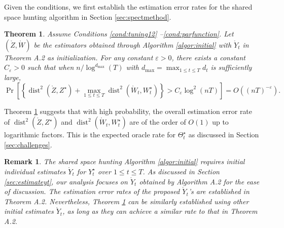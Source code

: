 \documentclass[12pt]{article}
\newcommand{\blue}[1]{\textcolor{blue}{#1}}
\newtheorem{theorem}{Theorem}
\newtheorem{remark}{Remark}
\newcommand{\dmax}{d_{\operatorname{max}}}
\begin{document}

Given the conditions, we first establish the estimation error rates for the shared space hunting algorithm in Section \ref{sec:spectmethod}. 



\begin{theorem} \label{thm:initial}
    Assume Conditions \ref{cond:tuning12}%
    --\ref{cond:parfunction}. Let $(\mathring Z,\mathring W)$ be the estimators obtained through Algorithm \ref{algor:initial} with  $\mathring Y_t$ in Theorem A.2 as initialization. 
    For any constant $\varepsilon>0$,
    there exists a constant $C_\varepsilon>0$
    such that when $n /\log^{\dmax}(T)$ with $\dmax = \max_{1\leqslant t\leqslant T} d_t$ is sufficiently large, 
    $$
    \Pr\left[ \left\{\operatorname{dist}^2(\mathring Z, Z^\star) +  \max_{1\leqslant t \leqslant T} \operatorname{dist}^2(\mathring W_t, W_t^\star) \right\} > C_\varepsilon \log^2(nT)\right] = O((nT)^{-\varepsilon}).
    $$
\end{theorem}


Theorem \ref{thm:initial} suggests that with high probability, the overall estimation error rate of $\operatorname{dist}^2(\mathring Z, Z^\star)$ and $\operatorname{dist}^2(\mathring W_t, W_t^\star) $ are of the order of $O(1)$ up to logarithmic factors.  
This is the expected oracle rate for $\Theta_t^{\star}$ as discussed in Section \ref{sec:challenges}.  %

\begin{remark}
The shared space hunting Algorithm \ref{algor:initial} requires initial individual estimates $\mathring{Y}_t$ for  ${Y}_t^{\star}$ over $1\leqslant t\leqslant T$. As discussed in Section \ref{sec:estimateyt}, our analysis  focuses on  $\mathring{Y}_t$ obtained by Algorithm  A.2 for the ease of discussion. The estimation error rates of the proposed  $\mathring{Y}_t$'s are established in Theorem A.2. Nevertheless,  Theorem \ref{thm:initial} can  be similarly established using other initial estimates $\mathring{Y}_t$, as long as they can achieve a similar rate to that in Theorem A.2. 
\end{remark}
\end{document}
